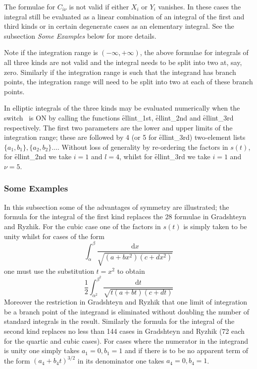 The formulae for $C_{i\nu}$ is not valid if either $X_i$ or $Y_i$ vanishes. In
these cases the integral still be evaluated as a linear combination of an
integral of the first and third kinds or in certain degenerate cases as an
elementary integral. See the subsection \emph{Some Examples} below for more
details.

Note if the integration range is $(-\infty, +\infty)$, the above formulae for
integrals of all three kinds are not valid and the integral needs to be split
into two at, say, zero. Similarly if the integration range is such that the
integrand has branch points, the integration range will need to be split into
two at each of these branch points.

In \REDUCE elliptic integrals of the three kinds may be evaluated numerically
when the switch \ is ON by calling the functions
\f{ellint\_1st},  \f{ellint\_2nd} and \f{ellint\_3rd} respectively.
The first two parameters are the lower and upper limits of the integration
range; these are followed by 4 (or 5 for \f{ellint\_3rd}) two-element lists
$\{a_1,b_1\}, \{a_2,b_2\} \ldots$.  Without loss of generality by re-ordering
the factors in $s(t)$, for \f{ellint\_2nd} we take $i=1$ and $l=4$, whilst for
\f{ellint\_3rd}  we take $i=1$ and $\nu=5$.

\subsubsection{Some Examples}
In this subsection some of the advantages of symmetry are illustrated; the formula for the
integral of the first kind replaces the 28 formulae in Gradshteyn and Ryzhik. For the cubic
case one of the factors in $s(t)$ is simply taken to be unity whilst for cases of the form
\[\int_\alpha^\beta \frac{\mathrm{d}x}{\sqrt{(a+b x^2)(c+d x^2)}}\]
one must use the substitution $t=x^2$ to obtain
\[\frac{1}{2}\int_{\alpha^2}^{\beta^2} \frac{\mathrm{d}t}{\sqrt{t(a+b t)(c+d t)}}\]
Moreover the restriction  in Gradshteyn and Ryzhik that one limit of integration
be a branch point of the integrand is
eliminated without doubling the number of standard integrals in the result.
Similarly the formula for the integral of the second kind replaces no less than
144 cases in Gradshteyn and Ryzhik (72 each for the quartic and cubic cases).
For cases where the numerator in the integrand is unity one simply takes $a_1=0,
b_1=1$ and if there is to be no apparent term of the form $(a_4+b_4t)^{3/2}$ in
its denominator one takes $a_4=0, b_4=1$.

